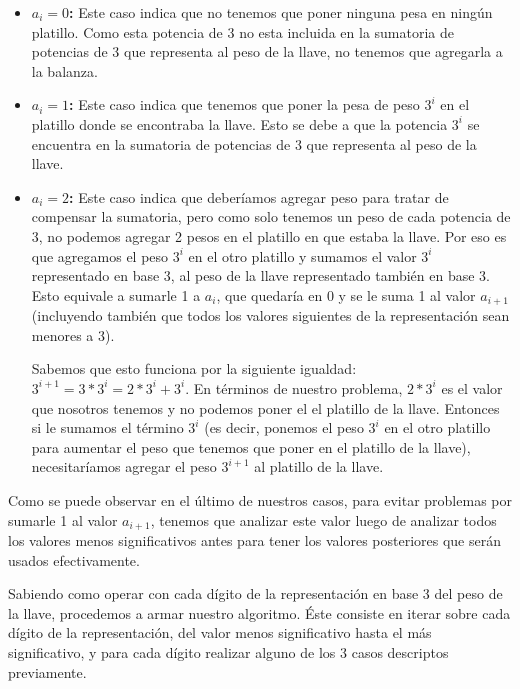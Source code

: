 \begin{itemize}
    \item \textbf{$a_i = 0$: } 
        Este caso indica que no tenemos que poner ninguna pesa en ningún platillo. Como esta potencia de 3 no esta incluida en la sumatoria de potencias de 3 que representa al peso de la llave, no tenemos que agregarla a la balanza.
        
    \item \textbf{$a_i = 1$: } 
        Este caso indica que tenemos que poner la pesa de peso $3^i$ en el platillo donde se encontraba la llave. Esto se debe a que la potencia $3^i$ se encuentra en la sumatoria de potencias de 3 que representa al peso de la llave. 
    
    \item \textbf{$a_i = 2$: } 
        Este caso indica que deberíamos agregar peso para tratar de compensar la sumatoria, pero como solo tenemos un peso de cada potencia de 3, no podemos agregar 2 pesos en el platillo en que estaba la llave. Por eso es que agregamos el peso $3^i$ en el otro platillo y sumamos el valor $3^i$ representado en base 3, al peso de la llave representado también en base 3. Esto equivale a sumarle 1 a $a_i$, que quedaría en 0 y se le suma 1 al valor $a_{i+1}$ (incluyendo también que todos los valores siguientes de la representación sean menores a 3).
        
        Sabemos que esto funciona por la siguiente igualdad:
        $3^{i+1} = 3*3^i = 2*3^i + 3^i$.
        En términos de nuestro problema, $2*3^i$ es el valor que nosotros tenemos y no podemos poner el el platillo de la llave. Entonces si le sumamos el término $3^i$ (es decir, ponemos el peso $3^i$ en el otro platillo para aumentar el peso que tenemos que poner en el platillo de la llave), necesitaríamos agregar el peso $3^{i+1}$ al platillo de la llave. 
        
\end{itemize}

Como se puede observar en el último de nuestros casos, para evitar problemas por sumarle 1 al valor $a_{i+1}$, tenemos que analizar este valor luego de analizar todos los valores menos significativos antes para tener los valores posteriores que serán usados efectivamente.

Sabiendo como operar con cada dígito de la representación en base 3 del peso de la llave, procedemos a armar nuestro algoritmo. Éste consiste en iterar sobre cada dígito de la representación, del valor menos significativo hasta el más significativo, y para cada dígito realizar alguno de los 3 casos descriptos previamente. 

